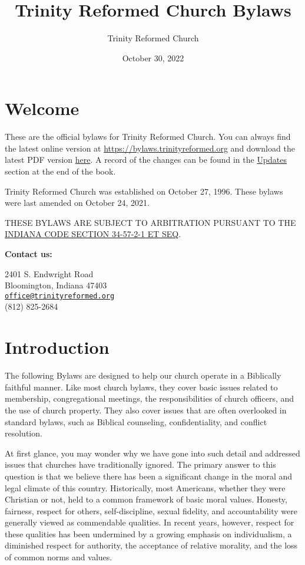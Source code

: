 \documentclass[
]{book}
\title{Trinity Reformed Church Bylaws}
\author{Trinity Reformed Church}
\date{October 30, 2022}
\begin{document}
\maketitle

{
\hypersetup{linkcolor=}
\setcounter{tocdepth}{1}
\tableofcontents
}
\hypertarget{welcome}{%
\chapter*{Welcome}\label{welcome}}

These are the official bylaws for Trinity Reformed Church. You can always find the latest online version at \url{https://bylaws.trinityreformed.org} and download the latest PDF version \href{https://bylaws.trinityreformed.org/trc-bylaws.pdf}{here}. A record of the changes can be found in the \href{https://bylaws.trinityreformed.org/updates.html}{Updates} section at the end of the book.

Trinity Reformed Church was established on October 27, 1996. These bylaws were last amended on October 24, 2021.

THESE BYLAWS ARE SUBJECT TO ARBITRATION PURSUANT TO THE \href{https://iga.in.gov/legislative/laws/2022/ic/titles/034\#34-57-2-1}{INDIANA CODE SECTION 34-57-2-1 ET SEQ}.

\textbf{Contact us:}

2401 S. Endwright Road\\
Bloomington, Indiana 47403\\
\href{mailto:office@trinityreformed.org}{\nolinkurl{office@trinityreformed.org}}\\
(812) 825-2684

\mainmatter

\hypertarget{introduction}{%
\chapter{Introduction}\label{introduction}}

The following Bylaws are designed to help our church operate in a Biblically faithful manner. Like most church bylaws, they cover basic issues related to membership, congregational meetings, the responsibilities of church officers, and the use of church property. They also cover issues that are often overlooked in standard bylaws, such as Biblical counseling, confidentiality, and conflict resolution.

At first glance, you may wonder why we have gone into such detail and addressed issues that churches have traditionally ignored. The primary answer to this question is that we believe there has been a significant change in the moral and legal climate of this country. Historically, most Americans, whether they were Christian or not, held to a common framework of basic moral values. Honesty, fairness, respect for others, self-discipline, sexual fidelity, and accountability were generally viewed as commendable qualities. In recent years, however, respect for these qualities has been undermined by a growing emphasis on individualism, a diminished respect for authority, the acceptance of relative morality, and the loss of common norms and values.
\end{document}
